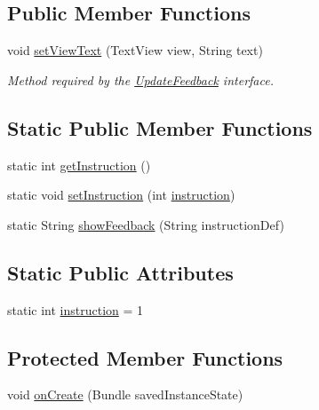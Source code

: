 \subsection*{Public Member Functions}
\begin{DoxyCompactItemize}
\item 
void \mbox{\hyperlink{classcom_1_1example_1_1trainawearapplication_1_1_plank_a4d4a46b71ced8fe89023ccbf14d17f77}{set\+View\+Text}} (Text\+View view, String text)
\begin{DoxyCompactList}\small\item\em Method required by the \mbox{\hyperlink{interfacecom_1_1example_1_1trainawearapplication_1_1_update_feedback}{Update\+Feedback}} interface. \end{DoxyCompactList}\end{DoxyCompactItemize}
\subsection*{Static Public Member Functions}
\begin{DoxyCompactItemize}
\item 
static int \mbox{\hyperlink{classcom_1_1example_1_1trainawearapplication_1_1_plank_a2220e1459dd56fb27948dcddf79bfcfa}{get\+Instruction}} ()
\item 
static void \mbox{\hyperlink{classcom_1_1example_1_1trainawearapplication_1_1_plank_a3cc3d10c2310227ff9fe69e49afac328}{set\+Instruction}} (int \mbox{\hyperlink{classcom_1_1example_1_1trainawearapplication_1_1_plank_a78c9024e55b5817aa05befcff69394c3}{instruction}})
\item 
static String \mbox{\hyperlink{classcom_1_1example_1_1trainawearapplication_1_1_plank_a14343873d9ff489757bebbad97adbaf1}{show\+Feedback}} (String instruction\+Def)
\end{DoxyCompactItemize}
\subsection*{Static Public Attributes}
\begin{DoxyCompactItemize}
\item 
static int \mbox{\hyperlink{classcom_1_1example_1_1trainawearapplication_1_1_plank_a78c9024e55b5817aa05befcff69394c3}{instruction}} = 1
\end{DoxyCompactItemize}
\subsection*{Protected Member Functions}
\begin{DoxyCompactItemize}
\item 
void \mbox{\hyperlink{classcom_1_1example_1_1trainawearapplication_1_1_plank_a8071af6c71d817914e58bd99b92c0904}{on\+Create}} (Bundle saved\+Instance\+State)
\end{DoxyCompactItemize}
